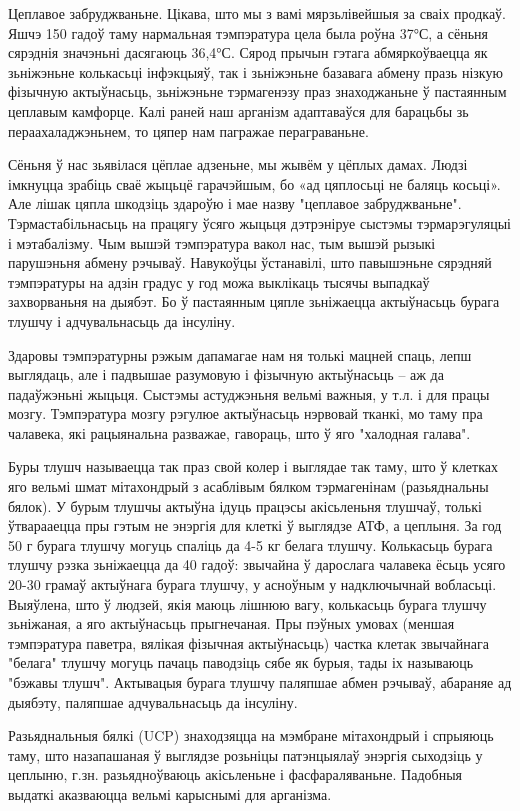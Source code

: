 Цеплавое забруджваньне. Цікава, што мы з вамі мярзьлівейшыя за сваіх продкаў. Яшчэ 150 гадоў таму нармальная тэмпэратура цела была роўна 37°С, а сёньня сярэднія значэньні дасягаюць 36,4°С. Сярод прычын гэтага абмяркоўваецца як зьніжэньне колькасьці інфэкцыяў, так і зьніжэньне базавага абмену празь нізкую фізычную актыўнасьць, зьніжэньне тэрмагенэзу праз знаходжаньне ў пастаянным цеплавым камфорце. Калі раней наш арганізм адаптаваўся для барацьбы зь пераахаладжэньнем, то цяпер нам пагражае пераграваньне.

Сёньня ў нас зьявілася цёплае адзеньне, мы жывём у цёплых дамах. Людзі імкнуцца зрабіць сваё жыцьцё гарачэйшым, бо «ад цяплосьці не баляць косьці». Але лішак цяпла шкодзіць здароўю і мае назву "цеплавое забруджваньне". Тэрмастабільнасьць на працягу ўсяго жыцьця дэтрэніруе сыстэмы тэрмарэгуляцыі і мэтабалізму. Чым вышэй тэмпэратура вакол нас, тым вышэй рызыкі парушэньня абмену рэчываў. Навукоўцы ўстанавілі, што павышэньне сярэдняй тэмпэратуры на адзін градус у год можа выклікаць тысячы выпадкаў захворваньня на дыябэт. Бо ў пастаянным цяпле зьніжаецца актыўнасьць бурага тлушчу і адчувальнасьць да інсуліну.

Здаровы тэмпэратурны рэжым дапамагае нам ня толькі мацней спаць, лепш выглядаць, але і падвышае разумовую і фізычную актыўнасьць – аж да падаўжэньні жыцьця. Сыстэмы астуджэньня вельмі важныя, у т.л. і для працы мозгу. Тэмпэратура мозгу рэгулюе актыўнасьць нэрвовай тканкі, мо таму пра чалавека, які рацыянальна разважае, гавораць, што ў яго "халодная галава".

Буры тлушч называецца так праз свой колер і выглядае так таму, што ў клетках яго вельмі шмат мітахондрый з асаблівым бялком тэрмагенінам (разьяднальны бялок). У бурым тлушчы актыўна ідуць працэсы акісьленьня тлушчаў, толькі ўтварааецца пры гэтым не энэргія для клеткі ў выглядзе АТФ, а цеплыня. За год 50 г бурага тлушчу могуць спаліць да 4-5 кг белага тлушчу. Колькасьць бурага тлушчу рэзка зьніжаецца да 40 гадоў: звычайна ў дарослага чалавека ёсьць усяго 20-30 грамаў актыўнага бурага тлушчу, у асноўным у надключычнай вобласьці. Выяўлена, што ў людзей, якія маюць лішнюю вагу, колькасьць бурага тлушчу зьніжаная, а яго актыўнасьць прыгнечаная. Пры пэўных умовах (меншая тэмпэратура паветра, вялікая фізычная актыўнасьць) частка клетак звычайнага "белага" тлушчу могуць пачаць паводзіць сябе як бурыя, тады іх называюць "бэжавы тлушч". Актывацыя бурага тлушчу паляпшае абмен рэчываў, абараняе ад дыябэту, паляпшае адчувальнасьць да інсуліну.

Разьяднальныя бялкі (UCP) знаходзяцца на мэмбране мітахондрый і спрыяюць таму, што назапашаная ў выглядзе розьніцы патэнцыялаў энэргія сыходзіць у цеплыню, г.зн. разьядноўваюць акісьленьне і фасфараляваньне. Падобныя выдаткі аказваюцца вельмі карыснымі для арганізма.

